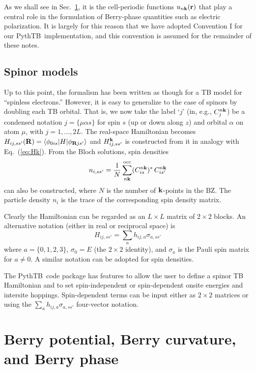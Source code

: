 \documentclass[11pt]{article}
\numberwithin{equation}{section} %
\def\beq{\begin{equation}}
\def\eeq{\end{equation}}
\newcommand{\equ}[1]{Eq.~(\ref{eq:#1})}
\def\PythTB{{\sc PythTB}}
\def\ket#1{\vert #1 \rangle}
\def\bra#1{\langle #1 \vert}
\def\me#1#2#3{\bra{#1}#2\ket{#3}}
\def\k{{\bf k}}
\def\r{{\bf r}}
\def\R{{\bf R}}
\begin{document}
As we shall see in Sec.~\ref{sec:berry}, it is the cell-periodic
functions $u_{n\k}(\r)$ that play a central role in the formulation
of Berry-phase quantities such as electric polarization.  It is
largely for this reason that we have adopted Convention I for our
\PythTB\ implementation, and this convention is assumed for the remainder
of these notes.

\subsection{Spinor models}
\label{sec:spinors}

Up to this point, the formalism has been written as though for
a TB model for ``spinless electrons.'' However, it is easy to
generalize to the case of spinors by doubling each TB orbital.
That is, we now take the label `$j$' (in, e.g., $C^{n\k}_j$)
be a condensed notation $j=\{\mu\alpha s\}$ for spin $s$ (up or
down along $z$) and orbital $\alpha$ on atom $\mu$, with
$j=1,...,2L$.  The real-space Hamiltonian becomes
$H_{ij,ss'}(\R)=\me{\phi_{0is}}{H}{\phi_{\R js'}}$
and $H_{ij,ss'}^\k$ is constructed from it in analogy
with \equ{Hk}.  From the Bloch solutions, spin densities
%
\beq
n_{i,ss'}=\frac{1}{N}\sum_{n\k}^\textrm{occ}
(C^{n\k}_{is})^*\, C^{n\k}_{is'}
\eeq
%
can also be constructed, where $N$ is the number of $\k$-points
in the BZ. The particle density $n_i$ is the trace of the
corresponding spin density matrix.

Clearly the Hamiltonian can be regarded as an $L\times L$
matrix of $2\times 2$ blocks.  An alternative notation (either in
real or reciprocal space) is
%
\beq
H_{ij,ss'} = \sum_a h_{ij,a} \sigma_{a,ss'}
\eeq
%
where $a=\{0,1,2,3\}$, $\sigma_0=E$ (the $2\times2$ identity),
and $\sigma_a$ is the Pauli spin matrix for $a\ne0$.
A similar notation can be adopted for spin densities.

The \PythTB\ code package has features to allow the user to define
a spinor TB Hamiltonian and to set spin-independent or spin-dependent
onsite energies and intersite hoppings.  Spin-dependent terms
can be input either as $2\times 2$ matrices or using the $\sum_a
h_{ij,a} \sigma_{a,ss'}$ four-vector notation.

\section{Berry potential, Berry curvature, and Berry phase}
\label{sec:berry}
\end{document}
